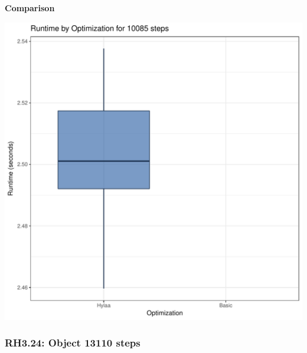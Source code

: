 \documentclass{article}\usepackage[]{graphicx}\usepackage[]{color}
\makeatletter
\def\maxwidth{ %
  \ifdim\Gin@nat@width>\linewidth
    \linewidth
  \else
    \Gin@nat@width
  \fi
}
\newenvironment{knitrout}{}{} %
\makeatother
\begin{document}
 \textbf{Comparison}
  
\begin{knitrout}
\color{fgcolor}
\includegraphics[width=\maxwidth]{figure/RH3_steps10085-1} 

\end{knitrout}


\subsubsection{RH3.24: Object 13110 steps}
\end{document}
